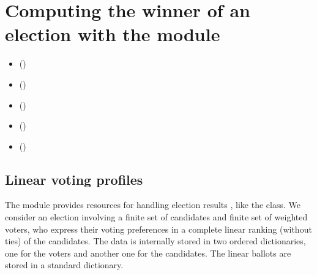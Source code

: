 \documentclass[a4paper,12pt,english]{sphinxhowto}
\begin{document}
\section{Computing the winner of an election with the  module}
\label{\detokenize{tutorial:computing-the-winner-of-an-election-with-the-votingprofiles-module}}\label{\detokenize{tutorial:linearvoting-tutorial-label}}
\begin{sphinxShadowBox}
\begin{itemize}
\item {} 
\label{\detokenize{tutorial:id258}}{\hyperref[\detokenize{tutorial:linear-voting-profiles}]{}} ()

\item {} 
\label{\detokenize{tutorial:id259}}{\hyperref[\detokenize{tutorial:computing-the-winner}]{}} ()

\item {} 
\label{\detokenize{tutorial:id260}}{\hyperref[\detokenize{tutorial:the-condorcet-winner}]{}} ()

\item {} 
\label{\detokenize{tutorial:id261}}{\hyperref[\detokenize{tutorial:cyclic-social-preferences}]{}} ()

\item {} 
\label{\detokenize{tutorial:id262}}{\hyperref[\detokenize{tutorial:on-generating-random-linear-voting-profiles}]{}} ()

\end{itemize}
\end{sphinxShadowBox}


\subsection{Linear voting profiles}
\label{\detokenize{tutorial:linear-voting-profiles}}
The  module provides resources for handling election results , like the  class. We consider an election involving a finite set of candidates and finite set of weighted voters, who express their voting preferences in a complete linear ranking (without ties) of the candidates. The data is internally stored in two ordered dictionaries, one for the voters and another one for the candidates. The linear ballots are stored in a standard dictionary.
\end{document}
